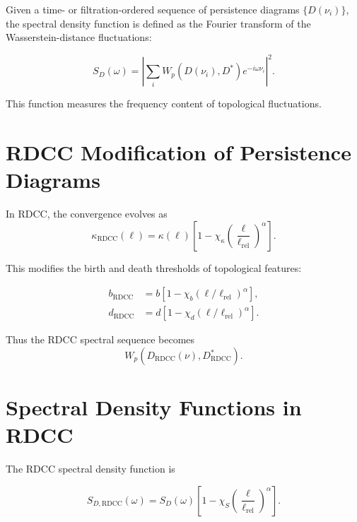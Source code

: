 \documentclass[11pt,a4paper]{article}
\begin{document}
Given a time- or filtration-ordered sequence of persistence diagrams 
$\{D(\nu_{i})\}$, the spectral density function is defined as the Fourier transform 
of the Wasserstein-distance fluctuations:

\begin{equation}
    S_{D}(\omega)
    = \left|
        \sum_{i}
        W_{p}(D(\nu_{i}), D^{*})
        e^{-i \omega \nu_{i}}
      \right|^{2}.
\end{equation}

This function measures the frequency content of topological fluctuations.
\section{RDCC Modification of Persistence Diagrams}

In RDCC, the convergence evolves as
\begin{equation}
    \kappa_{\mathrm{RDCC}}(\ell)
    = \kappa(\ell)
      \left[
        1 - \chi_{\kappa}
        \left(\frac{\ell}{\ell_{\mathrm{rel}}}\right)^{\alpha}
      \right].
\end{equation}

This modifies the birth and death thresholds of topological features:

\begin{align}
    b_{\mathrm{RDCC}} &= b \left[ 1 - \chi_{b} (\ell/\ell_{\mathrm{rel}})^{\alpha} \right], \\
    d_{\mathrm{RDCC}} &= d \left[ 1 - \chi_{d} (\ell/\ell_{\mathrm{rel}})^{\alpha} \right].
\end{align}

Thus the RDCC spectral sequence becomes
\begin{equation}
    W_{p}(D_{\mathrm{RDCC}}(\nu), D^{*}_{\mathrm{RDCC}}).
\end{equation}
\section{Spectral Density Functions in RDCC}

The RDCC spectral density function is

\begin{equation}
    S_{D,\mathrm{RDCC}}(\omega)
    = S_{D}(\omega)
      \left[
        1 - \chi_{S}
        \left(\frac{\ell}{\ell_{\mathrm{rel}}}\right)^{\alpha}
      \right].
\end{equation}
\end{document}
